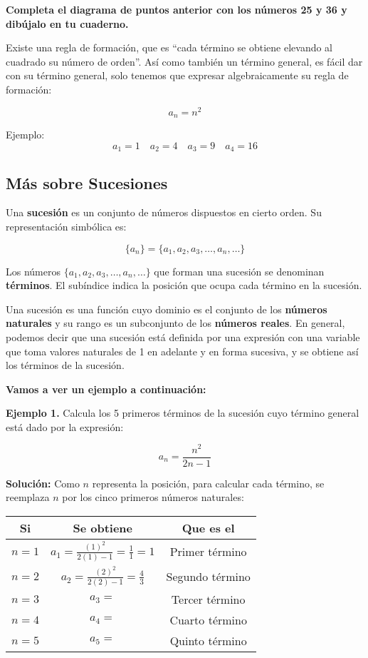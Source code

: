 \documentclass[12pt,a4paper]{article}
\begin{document}
\textbf{Completa el diagrama de puntos anterior con los números 25 y 36 y dibújalo en tu cuaderno.}

Existe una regla de formación, que es ``cada término se obtiene elevando al cuadrado su número de orden''. Así como también un término general, es fácil dar con su término general, solo tenemos que expresar algebraicamente su regla de formación:

\[ a_n = n^2 \]

Ejemplo:
\[ a_1 = 1 \quad a_2 = 4 \quad a_3 = 9 \quad a_4 = 16 \]

\newpage

\subsection*{Más sobre Sucesiones}

Una \textbf{sucesión} es un conjunto de números dispuestos en cierto orden. Su representación simbólica es:

\[ \{a_n\} = \{a_1, a_2, a_3, \ldots, a_n, \ldots\} \]

Los números $\{a_1, a_2, a_3, \ldots, a_n, \ldots\}$ que forman una sucesión se denominan \textbf{términos}. El subíndice indica la posición que ocupa cada término en la sucesión.

Una sucesión es una función cuyo dominio es el conjunto de los \textbf{números naturales} y su rango es un subconjunto de los \textbf{números reales}. En general, podemos decir que una sucesión está definida por una expresión con una variable que toma valores naturales de 1 en adelante y en forma sucesiva, y se obtiene así los términos de la sucesión.

\textbf{Vamos a ver un ejemplo a continuación:}

\textbf{Ejemplo 1.} Calcula los 5 primeros términos de la sucesión cuyo término general está dado por la expresión:

\[ a_n = \frac{n^2}{2n - 1} \]

\textbf{Solución:} Como $n$ representa la posición, para calcular cada término, se reemplaza $n$ por los cinco primeros números naturales:

\begin{center}
\begin{tabular}{|c|c|c|}
\hline
\textbf{Si} & \textbf{Se obtiene} & \textbf{Que es el} \\
\hline
$n = 1$ & $a_1 = \frac{(1)^2}{2(1) - 1} = \frac{1}{1} = 1$ & Primer término \\
\hline
$n = 2$ & $a_2 = \frac{(2)^2}{2(2) - 1} = \frac{4}{3}$ & Segundo término \\
\hline
$n = 3$ & $a_3 = $ & Tercer término \\
\hline
$n = 4$ & $a_4 = $ & Cuarto término \\
\hline
$n = 5$ & $a_5 = $ & Quinto término \\
\hline
\end{tabular}
\end{center}
\end{document}
